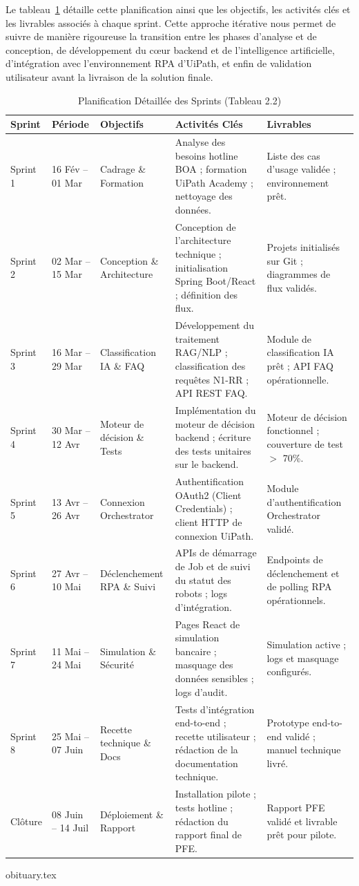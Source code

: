 Le tableau~\ref{tab:sprint_planning} détaille cette planification ainsi que les objectifs, les activités clés et les livrables associés à chaque sprint. Cette approche itérative nous permet de suivre de manière rigoureuse la transition entre les phases d’analyse et de conception, de développement du cœur backend et de l’intelligence artificielle, d’intégration avec l’environnement RPA d’UiPath, et enfin de validation utilisateur avant la livraison de la solution finale.

\begin{table}[htbp]
\centering
\small
\begin{tabular}{|l|l|p{3cm}|p{4.5cm}|p{3.5cm}|}
\hline
\textbf{Sprint} & \textbf{Période} & \textbf{Objectifs} & \textbf{Activités Clés} & \textbf{Livrables} \\ \hline
Sprint 1 & 16 Fév – 01 Mar & Cadrage \& Formation & Analyse des besoins hotline BOA ; formation UiPath Academy ; nettoyage des données. & Liste des cas d'usage validée ; environnement prêt. \\ \hline
Sprint 2 & 02 Mar – 15 Mar & Conception \& Architecture & Conception de l'architecture technique ; initialisation Spring Boot/React ; définition des flux. & Projets initialisés sur Git ; diagrammes de flux validés. \\ \hline
Sprint 3 & 16 Mar – 29 Mar & Classification IA \& FAQ & Développement du traitement RAG/NLP ; classification des requêtes N1-RR ; API REST FAQ. & Module de classification IA prêt ; API FAQ opérationnelle. \\ \hline
Sprint 4 & 30 Mar – 12 Avr & Moteur de décision \& Tests & Implémentation du moteur de décision backend ; écriture des tests unitaires sur le backend. & Moteur de décision fonctionnel ; couverture de test $>$ 70\%. \\ \hline
Sprint 5 & 13 Avr – 26 Avr & Connexion Orchestrator & Authentification OAuth2 (Client Credentials) ; client HTTP de connexion UiPath. & Module d'authentification Orchestrator validé. \\ \hline
Sprint 6 & 27 Avr – 10 Mai & Déclenchement RPA \& Suivi & APIs de démarrage de Job et de suivi du statut des robots ; logs d'intégration. & Endpoints de déclenchement et de polling RPA opérationnels. \\ \hline
Sprint 7 & 11 Mai – 24 Mai & Simulation \& Sécurité & Pages React de simulation bancaire ; masquage des données sensibles ; logs d'audit. & Simulation active ; logs et masquage configurés. \\ \hline
Sprint 8 & 25 Mai – 07 Juin & Recette technique \& Docs & Tests d'intégration end-to-end ; recette utilisateur ; rédaction de la documentation technique. & Prototype end-to-end validé ; manuel technique livré. \\ \hline
Clôture & 08 Juin – 14 Juil & Déploiement \& Rapport & Installation pilote ; tests hotline ; rédaction du rapport final de PFE. & Rapport PFE validé et livrable prêt pour pilote. \\ \hline
\end{tabular}
\caption{Planification Détaillée des Sprints (Tableau 2.2)}
\label{tab:sprint_planning}
\end{table}
 obituary.tex
